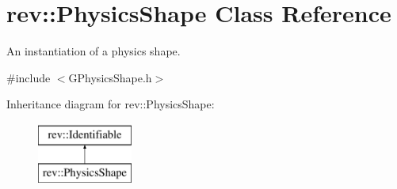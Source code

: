 \hypertarget{classrev_1_1_physics_shape}{}\section{rev\+::Physics\+Shape Class Reference}
\label{classrev_1_1_physics_shape}


An instantiation of a physics shape.  




{\ttfamily \#include $<$G\+Physics\+Shape.\+h$>$}

Inheritance diagram for rev\+::Physics\+Shape\+:\begin{figure}[H]
\begin{center}
\leavevmode
\includegraphics[height=2.000000cm]{classrev_1_1_physics_shape}
\end{center}
\end{figure}
